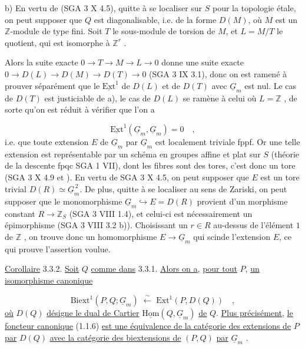 b) En vertu de (SGA 3 X 4.5), quitte à se localiser sur $S$ pour la topologie étale, on peut supposer que $Q$ est diagonalisable, i.e. de la forme $D(M)$, où $M$ est un $\mathbb{Z}$-module de type fini. Soit $T$ le sous-module de torsion de $M$, et $L = M/T$ le quotient, qui est isomorphe à $\mathbb{Z}^r$ .



Alors la suite exacte $0 \longrightarrow T \longrightarrow M \longrightarrow L \longrightarrow 0$ donne une suite exacte $0 \longrightarrow D(L) \longrightarrow D(M) \longrightarrow D(T) \longrightarrow 0$ (SGA 3 IX 3.1), donc on est ramené à prouver séparément que le $\underline{\mathrm{Ext}}^1$ de $D(L)$ et de $D(T)$ avec $\underline{G}_m$ est nul. Le cas de $D(T)$ est justiciable de a), le cas de $D(L)$ se ramène à celui où $L = \mathbb{Z}$ , de sorte qu'on est réduit à vérifier que l'on a

\begin{equation*}
\underline{\mathrm{Ext}}^1(\underline{G}_m,\underline{G}_m) = 0 \quad ,
\end{equation*}
i.e. que toute extension $E$ de $\underline{G}_m$ par $\underline{G}_m$ est localement triviale fppf. Or une telle extension est représentable par un schéma en groupes affine et plat sur $S$ (théorie de la descente fpqc SGA 1 VII), dont les fibres sont des tores, c'est donc un tore (SGA 3 X 4.9 et \qquad ). En vertu de SGA 3 X 4.5, on peut supposer que $E$ est un tore trivial $D(R) \simeq \underline{G}_m^{\,2}$. De plus, quitte à se localiser au sens de Zariski, on peut supposer que le monomorphisme $\underline{G}_m \hookrightarrow E = D(R)$ provient d'un morphisme constant $R \longrightarrow \mathbb{Z}_S$ (SGA 3 VIII 1.4), et celui-ci est nécessairement un épimorphisme (SGA 3 VIII 3.2 b)). Choisissant un $r \in R$ au-dessus de l'élément $1$ de $\mathbb{Z}$ , on trouve donc un homomorphisme $E \longrightarrow \underline{G}_m$ qui scinde l'extension $E$, ce qui prouve l'assertion voulue.

\underline{Corollaire} 3.3.2. \underline{Soit} $Q$ \underline{comme dans} 3.3.1. \underline{Alors on a}, \underline{pour tout} $P$, \underline{un isomorphisme canonique}

\begin{equation}\tag{3.3.2.1}
\mathrm{Biext}^1(P,Q;\underline{G}_m) \;\xleftarrow{\ \sim\ }\; \mathrm{Ext}^1(P,D(Q)) \quad ,
\end{equation}
\underline{où} $D(Q)$ \underline{désigne le dual de Cartier} $\underline{\mathrm{Hom}}(Q,\underline{G}_m)$ \underline{de} $Q$. \underline{Plus précisément}, \underline{le foncteur canonique} (1.1.6) \underline{est une équivalence de la catégorie des extensions de} $P$ \underline{par} $D(Q)$ \underline{avec la catégorie des biextensions de} $(P,Q)$ \underline{par} $\underline{G}_m$ .


